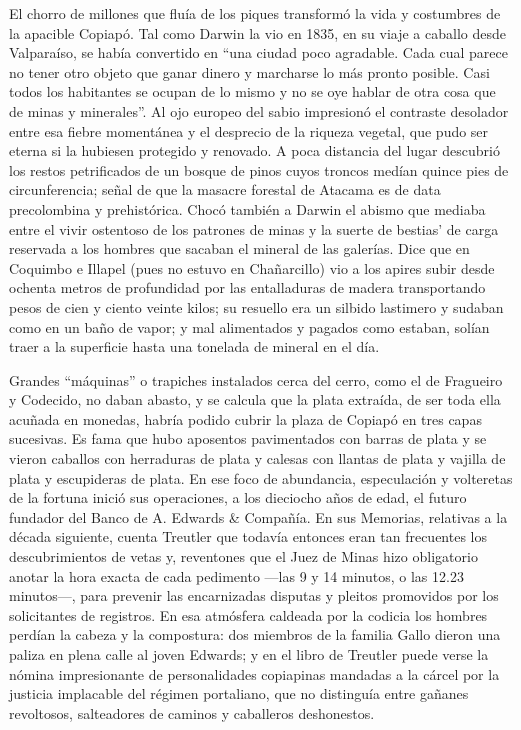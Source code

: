 \documentclass[10pt,twoside,openright]{memoir}
\begin{document}
El chorro de millones que fluía de los piques transformó la vida y
costumbres de la apacible Copiapó. Tal como Darwin la vio en 1835, en su
viaje a caballo desde Valparaíso, se había convertido en ``una ciudad
poco agradable. Cada cual parece no tener otro objeto que ganar dinero y
marcharse lo más pronto posible. Casi todos los habitantes se ocupan de
lo mismo y no se oye hablar de otra cosa que de minas y minerales''. Al
ojo europeo del sabio impresionó el contraste desolador entre esa fiebre
momentánea y el desprecio de la riqueza vegetal, que pudo ser eterna si
la hubiesen protegido y renovado. A poca distancia del lugar descubrió
los restos petrificados de un bosque de pinos cuyos troncos medían
quince pies de circunferencia; señal de que la masacre forestal de
Atacama es de data precolombina y prehistórica. Chocó también a Darwin
el abismo que mediaba entre el vivir ostentoso de los patrones de minas
y la suerte de bestias' de carga reservada a los hombres que sacaban el
mineral de las galerías. Dice que en Coquimbo e Illapel (pues no estuvo
en Chañarcillo) vio a los apires subir desde ochenta metros de
profundidad por las entalladuras de madera transportando pesos de cien y
ciento veinte kilos; su resuello era un silbido lastimero y sudaban como
en un baño de vapor; y mal alimentados y pagados como estaban, solían
traer a la superficie hasta una tonelada de mineral en el día.

Grandes ``máquinas'' o trapiches instalados cerca del cerro, como el de
Fragueiro y Codecido, no daban abasto, y se calcula que la plata
extraída, de ser toda ella acuñada en monedas, habría podido cubrir la
plaza de Copiapó en tres capas sucesivas. Es fama que hubo aposentos
pavimentados con barras de plata y se vieron caballos con herraduras de
plata y calesas con llantas de plata y vajilla de plata y escupideras de
plata. En ese foco de abundancia, especulación y volteretas de la
fortuna inició sus operaciones, a los dieciocho años de edad, el futuro
fundador del Banco de A. Edwards \& Compañía. En sus Memorias, relativas
a la década siguiente, cuenta Treutler que todavía entonces eran tan
frecuentes los descubrimientos de vetas y, reventones que el Juez de
Minas hizo obligatorio anotar la hora exacta de cada pedimento ---las 9
y 14 minutos, o las 12.23 minutos---, para prevenir las encarnizadas
disputas y pleitos promovidos por los solicitantes de registros. En esa
atmósfera caldeada por la codicia los hombres perdían la cabeza y la
compostura: dos miembros de la familia Gallo dieron una paliza en plena
calle al joven Edwards; y en el libro de Treutler puede verse la nómina
impresionante de personalidades copiapinas mandadas a la cárcel por la
justicia implacable del régimen portaliano, que no distinguía entre
gañanes revoltosos, salteadores de caminos y caballeros deshonestos.
\end{document}
